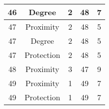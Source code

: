 \documentclass[results.tex]{subfiles}
\begin{document}
\begin{center}
\begin{tabular}{| c || c | c | c | c |}
    \hline
    46 & Degree & 2 & 48 & 7 \\ 
    \hline
    47 & Proximity & 2 & 48 & 5 \\ 
    \hline
    47 & Degree & 2 & 48 & 5 \\ 
    \hline
    47 & Protection & 2 & 48 & 5 \\ 
    \hline
    48 & Proximity & 3 & 47 & 9 \\ 
    \hline
    49 & Proximity & 1 & 49 & 7 \\ 
    \hline
    49 & Protection & 1 & 49 & 7 \\ 
    \hline   \end{tabular}
\end{center}
\end{document}
